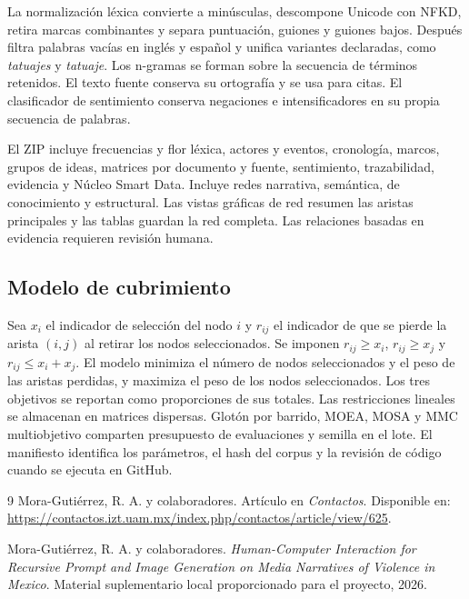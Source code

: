 \documentclass[11pt]{article}
\begin{document}
La normalización léxica convierte a minúsculas, descompone Unicode con NFKD, retira marcas combinantes y separa puntuación, guiones y guiones bajos. Después filtra palabras vacías en inglés y español y unifica variantes declaradas, como \emph{tatuajes} y \emph{tatuaje}. Los n-gramas se forman sobre la secuencia de términos retenidos. El texto fuente conserva su ortografía y se usa para citas. El clasificador de sentimiento conserva negaciones e intensificadores en su propia secuencia de palabras.

El ZIP incluye frecuencias y flor léxica, actores y eventos, cronología, marcos, grupos de ideas, matrices por documento y fuente, sentimiento, trazabilidad, evidencia y Núcleo Smart Data. Incluye redes narrativa, semántica, de conocimiento y estructural. Las vistas gráficas de red resumen las aristas principales y las tablas guardan la red completa. Las relaciones basadas en evidencia requieren revisión humana.

\subsection{Modelo de cubrimiento}
Sea $x_i$ el indicador de selección del nodo $i$ y $r_{ij}$ el indicador de que se pierde la arista $(i,j)$ al retirar los nodos seleccionados. Se imponen $r_{ij}\ge x_i$, $r_{ij}\ge x_j$ y $r_{ij}\le x_i+x_j$. El modelo minimiza el número de nodos seleccionados y el peso de las aristas perdidas, y maximiza el peso de los nodos seleccionados. Los tres objetivos se reportan como proporciones de sus totales. Las restricciones lineales se almacenan en matrices dispersas. Glotón por barrido, MOEA, MOSA y MMC multiobjetivo comparten presupuesto de evaluaciones y semilla en el lote. El manifiesto identifica los parámetros, el hash del corpus y la revisión de código cuando se ejecuta en GitHub.

\begin{thebibliography}{9}
Mora-Gutiérrez, R. A. y colaboradores. Artículo en \emph{Contactos}. Disponible en: \url{https://contactos.izt.uam.mx/index.php/contactos/article/view/625}.

Mora-Gutiérrez, R. A. y colaboradores. \emph{Human-Computer Interaction for Recursive Prompt and Image Generation on Media Narratives of Violence in Mexico}. Material suplementario local proporcionado para el proyecto, 2026.
\end{thebibliography}


\end{document}
